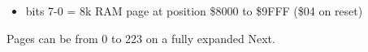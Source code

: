 \begin{itemize}
\item bits 7-0 = 8k RAM page at position \$8000 to \$9FFF (\$04 on
  reset)
\end{itemize}
Pages can be from 0 to 223 on a fully expanded Next.

